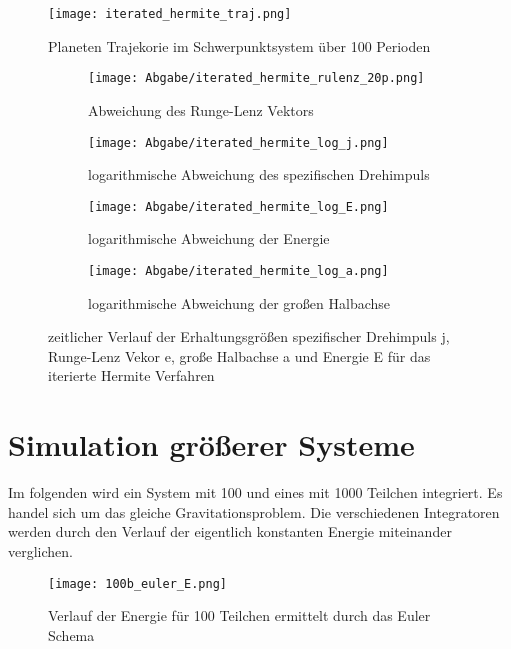 \documentclass[12pt]{article}
\begin{document}
    \begin{figure}[H]\centering\texttt{[image: iterated\_hermite\_traj.png]}\caption{Planeten Trajekorie im Schwerpunktsystem über 100 Perioden}\end{figure} 
    \begin{figure}[H]
        \hspace*{-1.5cm}
        \begin{subfigure}{0.4\textwidth}
        \texttt{[image: Abgabe/iterated\_hermite\_rulenz\_20p.png]}
        \caption{Abweichung des Runge-Lenz Vektors}
        \end{subfigure}
        \hfill
        \begin{subfigure}{0.4\textwidth}
        \hspace*{-0.8cm}
        \texttt{[image: Abgabe/iterated\_hermite\_log\_j.png]}
        \caption{logarithmische Abweichung des spezifischen Drehimpuls}
        \end{subfigure}
        \hfill
        \hspace*{-1.5cm}
        \begin{subfigure}{0.4\textwidth}
        \texttt{[image: Abgabe/iterated\_hermite\_log\_E.png]}
        \caption{logarithmische Abweichung der Energie}
        \end{subfigure}
        \hfill
        \begin{subfigure}{0.4\textwidth}
        \hspace*{-0.8cm}
        \texttt{[image: Abgabe/iterated\_hermite\_log\_a.png]}
        \caption{logarithmische Abweichung der großen Halbachse}
        \end{subfigure}
        \hfill
        \caption{zeitlicher Verlauf der Erhaltungsgrößen spezifischer Drehimpuls j, Runge-Lenz Vekor e, große Halbachse a und Energie E für das iterierte Hermite Verfahren}\end{figure}


\section*{Simulation größerer Systeme}
Im folgenden wird ein System mit 100 und eines mit 1000 Teilchen integriert. Es handel sich um das gleiche Gravitationsproblem. Die verschiedenen Integratoren werden durch den Verlauf der eigentlich konstanten Energie miteinander verglichen.

\begin{figure}[H]\centering\texttt{[image: 100b\_euler\_E.png]}\caption{Verlauf der Energie für 100 Teilchen ermittelt durch das Euler Schema}\end{figure}
\end{document}
